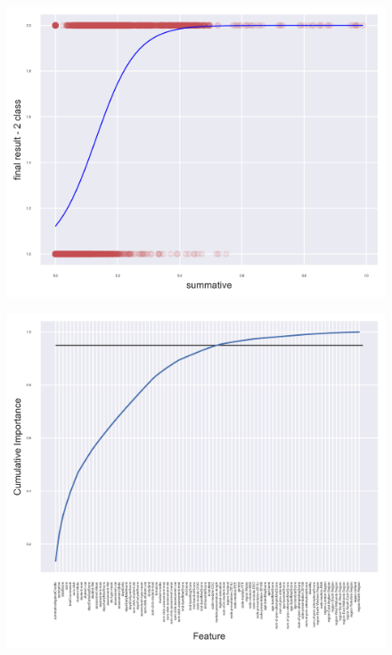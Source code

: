 \documentclass[11pt, a4paper, twocolumn]{article}
\begin{document}
\centering
\begin{figure}[h]
	\includegraphics[width=\linewidth]{LogisticRegression_2_class_model_against_summative.png} 
	\label{fig:LogSumm}
\end{figure}
\centering
\begin{figure}[h]
	\includegraphics[width=\linewidth]{Importances.png} 
	\label{fig:importances}
\end{figure}
\centering
\end{document}
